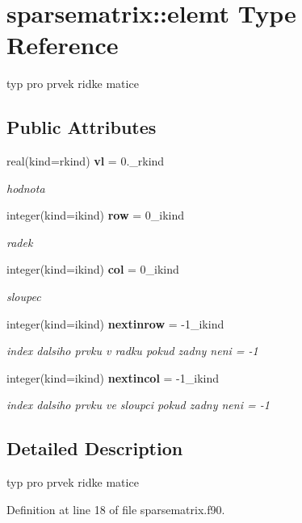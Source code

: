 \section{sparsematrix\+:\+:elemt Type Reference}
\label{structsparsematrix_1_1elemt}


typ pro prvek ridke matice  


\subsection*{Public Attributes}
\begin{DoxyCompactItemize}
\item 
real(kind=rkind) {\bf vl} = 0.\+\_\+rkind
\begin{DoxyCompactList}\small\item\em hodnota \end{DoxyCompactList}\item 
integer(kind=ikind) {\bf row} = 0\+\_\+ikind
\begin{DoxyCompactList}\small\item\em radek \end{DoxyCompactList}\item 
integer(kind=ikind) {\bf col} = 0\+\_\+ikind
\begin{DoxyCompactList}\small\item\em sloupec \end{DoxyCompactList}\item 
integer(kind=ikind) {\bf nextinrow} = -\/1\+\_\+ikind
\begin{DoxyCompactList}\small\item\em index dalsiho prvku v radku pokud zadny neni = -\/1 \end{DoxyCompactList}\item 
integer(kind=ikind) {\bf nextincol} = -\/1\+\_\+ikind
\begin{DoxyCompactList}\small\item\em index dalsiho prvku ve sloupci pokud zadny neni = -\/1 \end{DoxyCompactList}\end{DoxyCompactItemize}


\subsection{Detailed Description}
typ pro prvek ridke matice 

Definition at line 18 of file sparsematrix.\+f90.



